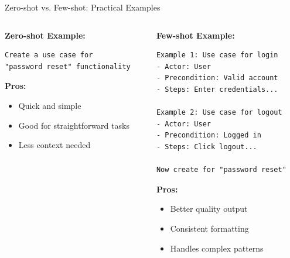 \documentclass{beamer}
\begin{document}
\begin{frame}[fragile]{Zero-shot vs. Few-shot: Practical Examples}
    \begin{columns}
        \begin{column}{0.5\textwidth}
            \textbf{Zero-shot Example:}
            \begin{lstlisting}[style=code]
Create a use case for 
"password reset" functionality
            \end{lstlisting}
            
            \textbf{Pros:}
            \begin{itemize}
                \item Quick and simple
                \item Good for straightforward tasks
                \item Less context needed
            \end{itemize}
        \end{column}
        \begin{column}{0.5\textwidth}
            \textbf{Few-shot Example:}
            \begin{lstlisting}[style=code]
Example 1: Use case for login
- Actor: User
- Precondition: Valid account
- Steps: Enter credentials...

Example 2: Use case for logout
- Actor: User
- Precondition: Logged in
- Steps: Click logout...

Now create for "password reset"
            \end{lstlisting}
            
            \textbf{Pros:}
            \begin{itemize}
                \item Better quality output
                \item Consistent formatting
                \item Handles complex patterns
            \end{itemize}
        \end{column}
    \end{columns}
\end{frame}
\end{document}
